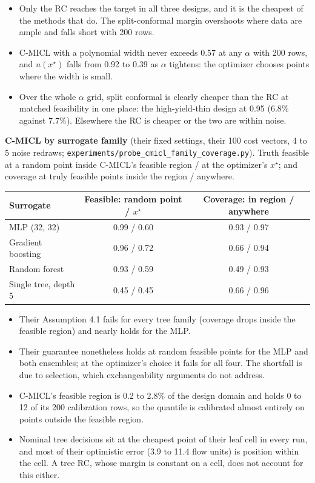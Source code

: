 \begin{outline}
\begin{itemize}
  \item Only the RC reaches the target in all three designs, and it is the
    cheapest of the methods that do. The split-conformal margin overshoots
    where data are ample and falls short with 200 rows.
  \item C-MICL with a polynomial width never exceeds 0.57 at any $\alpha$ with
    200 rows, and $u(x^\star)$ falls from 0.92 to 0.39 as $\alpha$ tightens:
    the optimizer chooses points where the width is small.
  \item Over the whole $\alpha$ grid, split conformal is clearly cheaper than
    the RC at matched feasibility in one place: the high-yield-thin design at
    0.95 (6.8\% against 7.7\%). Elsewhere the RC is cheaper or the two are
    within noise.
\end{itemize}

\textbf{C-MICL by surrogate family} (their fixed settings, their 100 cost
vectors, 4 to 5 noise redraws; \texttt{experiments/probe\_cmicl\_family\_coverage.py}).
Truth feasible at a random point inside C-MICL's feasible region / at the
optimizer's $x^\star$; and coverage at truly feasible points inside the region
/ anywhere.

\smallskip
\begin{tabular}{@{}lcc@{}}
\toprule
Surrogate & Feasible: random point / $x^\star$ & Coverage: in region / anywhere \\
\midrule
MLP (32, 32)           & 0.99 / 0.60 & 0.93 / 0.97 \\
Gradient boosting      & 0.96 / 0.72 & 0.66 / 0.94 \\
Random forest          & 0.93 / 0.59 & 0.49 / 0.93 \\
Single tree, depth 5   & 0.45 / 0.45 & 0.66 / 0.96 \\
\bottomrule
\end{tabular}
\smallskip

\begin{itemize}
  \item Their Assumption 4.1 fails for every tree family (coverage drops
    inside the feasible region) and nearly holds for the MLP.
  \item Their guarantee nonetheless holds at random feasible points for the
    MLP and both ensembles; at the optimizer's choice it fails for all four.
    The shortfall is due to selection, which exchangeability arguments do
    not address.
  \item C-MICL's feasible region is 0.2 to 2.8\% of the design domain and
    holds 0 to 12 of its 200 calibration rows, so the quantile is calibrated
    almost entirely on points outside the feasible region.
  \item Nominal tree decisions sit at the cheapest point of their leaf cell
    in every run, and most of their optimistic error (3.9 to 11.4 flow units)
    is position within the cell. A tree RC, whose margin is constant on a
    cell, does not account for this either.
\end{itemize}
\end{outline}


